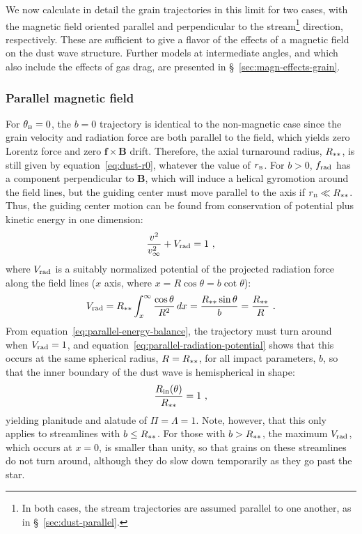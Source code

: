 We now calculate in detail the grain trajectories in this limit for
two cases, with the magnetic field oriented parallel and perpendicular
to the stream\footnote{In both cases, the stream trajectories are
  assumed parallel to one another, as in \S~\ref{sec:dust-parallel}.}
direction, respectively. These are sufficient to give a flavor of the
effects of a magnetic field on the dust wave structure.  Further
models at intermediate angles, and which also include the effects of
gas drag, are presented in \S~\ref{sec:magn-effects-grain}.

\subsubsection{Parallel magnetic field}
\label{sec:parall-magn-field}

For \(\theta_{\scriptscriptstyle\text{B}} = 0\), the \(b = 0\) trajectory is identical to the
non-magnetic case since the grain velocity and radiation force are
both parallel to the field, which yields zero Lorentz force and zero
\(\bm{f} \times \bm{B}\) drift. Therefore, the axial turnaround radius,
\(R_{**}\), is still given by equation~\eqref{eq:dust-r0},
whatever the value of \(r_{\scriptscriptstyle\text{B}}\).  For \(b > 0 \), \(f_{\text{rad}}\) has
a component perpendicular to \(\bm{B}\), which will induce a helical
gyromotion around the field lines, but the guiding center must move
parallel to the axis if \(r_{\scriptscriptstyle\text{B}} \ll R_{**}\).  Thus, the guiding
center motion can be found from conservation of potential plus kinetic
energy in one dimension:
\begin{equation}
  \label{eq:parallel-energy-balance}
  \frac{v^2}{v_\infty^2} + V_{\text{rad}} = 1 \ , 
\end{equation}
where \(V_{\text{rad}}\) is a suitably normalized potential of the projected
radiation force along the field lines (\(x\) axis, where
\(x = R \cos\theta = b \cot\theta\)):
\begin{equation}
  \label{eq:parallel-radiation-potential}
  V_{\text{rad}} = R_{**} \int_x^\infty \frac{\cos\theta}{R^2}\, dx
  = \frac{R_{**}\sin\theta}{b}
  = \frac{R_{**}}{R} \ .
\end{equation}
From equation~\eqref{eq:parallel-energy-balance}, the trajectory must
turn around when \(V_{\text{rad}} = 1\), and
equation~\eqref{eq:parallel-radiation-potential} shows that this
occurs at the same spherical radius, \(R = R_{**}\), for all
impact parameters, \(b\), so that the inner boundary of the dust wave
is hemispherical in shape:
\begin{equation}
  \label{eq:thB-0-shape}
  \frac{R_{\text{in}}(\theta)} {R_{**}} = 1 \ ,
\end{equation}
yielding planitude and alatude of \(\Pi = \Lambda = 1\).  Note, however, that
this only applies to streamlines with \(b \le R_{**}\).  For those
with \(b > R_{**}\), the maximum \(V_{\text{rad}}\), which occurs at
\(x = 0\), is smaller than unity, so that grains on these streamlines
do not turn around, although they do slow down temporarily as they go
past the star.

